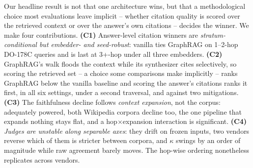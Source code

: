 Our headline result is not that one architecture wins, but that a
methodological choice most evaluations leave implicit -- whether
citation quality is scored over the retrieved context or over the
answer's own citations -- decides the winner. We make four contributions.
\textbf{(C1)} Answer-level citation winners are
\emph{stratum-conditional but embedder- and seed-robust}: vanilla ties
GraphRAG on 1--2-hop DO-178C queries and is last at 3+-hop under all
three embedders.
\textbf{(C2)} GraphRAG's walk floods the context while its synthesizer
cites selectively, so scoring the retrieved set -- a choice some
comparisons make implicitly -- ranks GraphRAG below the vanilla
baseline and scoring the answer's citations ranks it first, in all six
settings, under a second traversal, and against two mitigations.
\textbf{(C3)} The faithfulness decline follows \emph{context
expansion}, not the corpus: adequately powered, both Wikipedia corpora
decline too, the one pipeline that expands nothing stays flat, and a
hop$\times$expansion interaction is significant.
\textbf{(C4)} \emph{Judges are unstable along separable axes}: they
drift on frozen inputs, two vendors reverse which of them is stricter
between corpora, and $\kappa$ swings by an order of magnitude while raw
agreement barely moves. The hop-wise ordering nonetheless replicates
across vendors.
